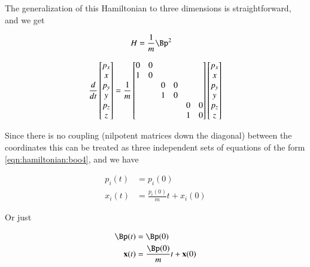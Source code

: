 The generalization of this Hamiltonian to three dimensions is straightforward, and we get

\begin{align}\label{eqn:hamiltonian:boo9}
H &= \inv{m} \Bp^2 
\end{align}

\begin{align}\label{eqn:hamiltonian:boo10}
\frac{d}{dt}
\begin{bmatrix}
p_x \\
x \\
p_y \\
y \\
p_z \\
z \\
\end{bmatrix}
=
\frac{1}{m}
\begin{bmatrix}
0 & 0 &   &   &   &   \\
1 & 0 &   &   &   &   \\
  &   & 0 & 0 &   &   \\
  &   & 1 & 0 &   &   \\
  &   &   &   & 0 & 0 \\
  &   &   &   & 1 & 0 \\
\end{bmatrix}
\begin{bmatrix}
p_x \\
x \\
p_y \\
y \\
p_z \\
z \\
\end{bmatrix}
\end{align}

Since there is no coupling (nilpotent matrices down the diagonal) between the coordinates this can be treated as three independent sets of equations of the form \ref{eqn:hamiltonian:boo4}, and we have

\begin{align}\label{eqn:hamiltonian:boo11}
p_i(t) &= p_i(0) \\
x_i(t) &= \frac{p_i(0)}{m} t + x_i(0)
\end{align}

Or just

\begin{align}\label{eqn:hamiltonian:boo12}
\Bp(t) &= \Bp(0) \\
\Bx(t) &= \frac{\Bp(0)}{m} t + \Bx(0)
\end{align}

